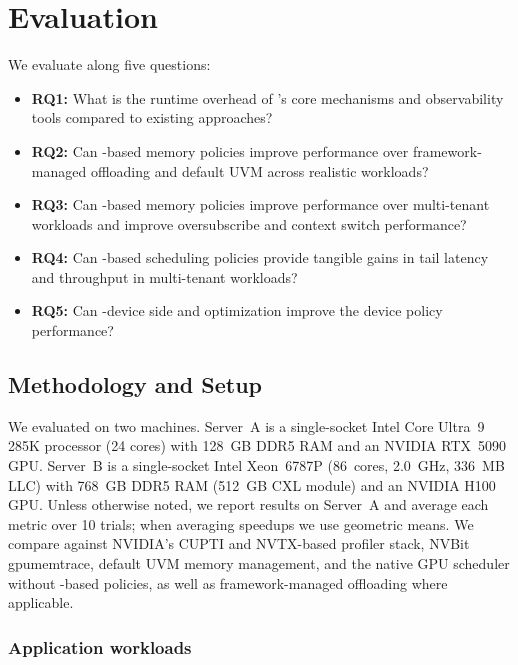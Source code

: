 \section{Evaluation}
\label{sec:eval}

We evaluate \sys along five questions:

\begin{itemize}[leftmargin=*]
  \item \textbf{RQ1:} What is the runtime overhead of \sys's core mechanisms and
        observability tools compared to existing approaches?
  \item \textbf{RQ2:} Can \sys-based memory policies improve performance over
        framework-managed offloading and default UVM across realistic workloads?
  \item \textbf{RQ3:} Can \sys-based memory policies improve performance over
        multi-tenant workloads and improve oversubscribe and context switch performance?
  \item \textbf{RQ4:} Can \sys-based scheduling policies provide tangible gains
        in tail latency and throughput in multi-tenant workloads?
  \item \textbf{RQ5:} Can \sys-device side and optimization improve the device policy performance?
\end{itemize}

\subsection{Methodology and Setup}

We evaluated \sys on two machines. Server~A is a single-socket Intel Core
Ultra~9 285K processor (24 cores) with 128~GB DDR5 RAM and an NVIDIA RTX~5090
GPU. Server~B is a single-socket Intel Xeon~6787P (86~cores, 2.0~GHz, 336~MB
LLC) with 768~GB DDR5 RAM (512~GB CXL module) and an NVIDIA H100 GPU. Unless
otherwise noted, we report results on Server~A and average each metric over
10 trials; when averaging speedups we use geometric means. We compare against
NVIDIA's CUPTI and NVTX-based profiler stack, NVBit gpumemtrace, default UVM
memory management, and the native GPU scheduler without \sys-based policies, as
well as framework-managed offloading where applicable.

\subsubsection{Application workloads}
\label{sec:eval-app-workloads}

